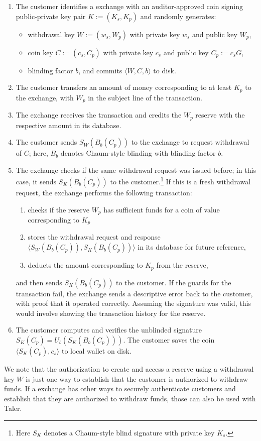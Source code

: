 \documentclass{llncs}
\begin{document}
\begin{enumerate}
  \item The customer identifies a exchange with an auditor-approved
        coin signing public-private key pair $K := (K_s, K_p)$
        and randomly generates:
        \begin{itemize}
           \item withdrawal key $W := (w_s,W_p)$ with private key $w_s$ and public key $W_p$,
           \item coin key $C := (c_s,C_p)$ with private key $c_s$ and public key $C_p := c_s G$,
           \item blinding factor $b$, and commits $\langle W, C, b \rangle$ to disk.
        \end{itemize}
  \item The customer transfers an amount of money corresponding to at least $K_p$ to the exchange, with $W_p$ in the subject line of the transaction.
  \item The exchange receives the transaction and credits the $W_p$ reserve with the respective amount in its database.
  \item The customer sends $S_W(B_b(C_p))$ to the exchange to request withdrawal of $C$; here, $B_b$ denotes Chaum-style blinding with blinding factor $b$.
  \item The exchange checks if the same withdrawal request was issued before; in this case, it sends $S_{K}(B_b(C_p))$ to the customer.\footnote{Here $S_K$
        denotes a Chaum-style blind signature with private key $K_s$.}
        If this is a fresh withdrawal request, the exchange performs the following transaction:
        \begin{enumerate}
           \item checks if the reserve $W_p$ has sufficient funds for a coin of value corresponding to $K_p$
           \item stores the withdrawal request and response $\langle S_W(B_b(C_p)), S_K(B_b(C_p)) \rangle$ in its database for future reference,
           \item deducts the amount corresponding to $K_p$ from the reserve,
        \end{enumerate}
        and then sends $S_{K}(B_b(C_p))$ to the customer.
        If the guards for the transaction fail, the exchange sends a descriptive error back to the customer,
        with proof that it operated correctly.
        Assuming the signature was valid, this would involve showing the transaction history for the reserve.
  \item The customer computes and verifies the unblinded signature $S_K(C_p) = U_b(S_K(B_b(C_p)))$.
        The customer saves the coin $\langle S_K(C_p), c_s \rangle$ to local wallet on disk.
\end{enumerate}
We note that the authorization to create and access a reserve using a
withdrawal key $W$ is just one way to establish that the customer is
authorized to withdraw funds.  If a exchange has other ways to securely
authenticate customers and establish that they are authorized to
withdraw funds, those can also be used with Taler.
\end{document}
